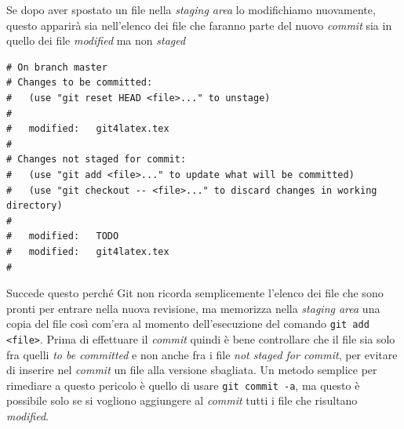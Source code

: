 \documentclass[a4paper,12pt,oneside]{article}
\begin{document}
Se dopo aver spostato un file nella \emph{staging area} lo modifichiamo
nuovamente, questo apparirà sia nell'elenco dei file che faranno parte del nuovo
\emph{commit} sia in quello dei file \emph{modified} ma non \emph{staged}
\begin{lstlisting}
# On branch master
# Changes to be committed:
#   (use "git reset HEAD <file>..." to unstage)
#
#	modified:   git4latex.tex
#
# Changes not staged for commit:
#   (use "git add <file>..." to update what will be committed)
#   (use "git checkout -- <file>..." to discard changes in working directory)
#
#	modified:   TODO
#	modified:   git4latex.tex
#
\end{lstlisting}
Succede questo perché Git non ricorda semplicemente l'elenco dei file che sono
pronti per entrare nella nuova revisione, ma memorizza nella \emph{staging area}
una copia del file così com'era al momento dell'esecuzione del comando
\lstinline|git add <file>|. Prima di effettuare il \emph{commit} quindi è bene
controllare che il file sia solo fra quelli \emph{to be committed} e non anche
fra i file \emph{not staged for commit}, per evitare di inserire nel
\emph{commit} un file alla versione sbagliata. Un metodo semplice per rimediare
a questo pericolo è quello di usare \lstinline|git commit -a|, ma questo è
possibile solo se si vogliono aggiungere al \emph{commit} tutti i file che
risultano \emph{modified}.
\end{document}
